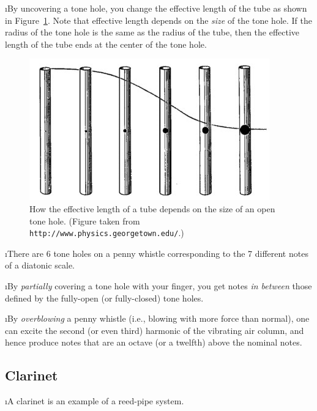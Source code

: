 \i By uncovering a tone hole, you change the effective length
of the tube as shown in Figure~\ref{f:tonehole}.
Note that effective length depends on the 
{\em size} of the tone hole.
If the radius of the tone hole is the same as the radius of 
the tube, then the effective length of the tube ends at the
center of the tone hole.
%
\begin{figure}[htbp]
\begin{center}
\includegraphics[height=.5\textwidth]{tonehole.jpg}
\caption{How the effective length of a tube depends
on the size of an open tone hole.
(Figure taken from {\tt http://www.physics.georgetown.edu/}.)}
\label{f:tonehole}
\end{center}
\end{figure}

\i There are 6 tone holes on a penny whistle corresponding 
to the 7 different notes of a diatonic scale.

\i By {\em partially} covering a tone hole with your finger, 
you get notes {\em in between} those defined by the fully-open 
(or fully-closed) tone holes.

\i By {\em overblowing} a penny whistle (i.e., blowing with 
more force than normal), one can excite the second
(or even third) harmonic  
of the vibrating air column, and hence produce notes that are
an octave (or a twelfth) above the nominal notes.

\ei
\subsection{Clarinet}
\bi

\i A clarinet is an example of a reed-pipe system.

